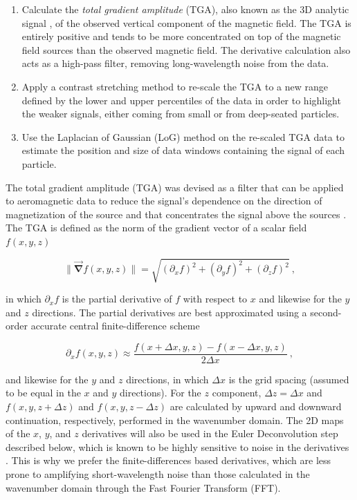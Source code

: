 \begin{enumerate}
\item Calculate the \textit{total gradient amplitude} (TGA), also known as the 3D analytic signal \citep{Roest1992Magnetic}, of the observed vertical   component of the magnetic field. The TGA is entirely positive and tends to be more concentrated on top of the magnetic field sources than the observed magnetic field. The derivative calculation also acts as a high-pass filter, removing long-wavelength noise from the data.
\item Apply a contrast stretching method to re-scale the TGA to a new range   defined by the lower and upper percentiles of the data in order to highlight the weaker signals, either coming from small or from deep-seated particles.
\item Use the Laplacian of Gaussian (LoG) method \citep{VanderWalt2014} on the   re-scaled TGA data to estimate the position and size of data windows containing the signal of each particle.
\end{enumerate}

The total gradient amplitude (TGA) was devised as a filter that can be applied
to aeromagnetic data to reduce the signal's dependence on the direction of
magnetization of the source and that concentrates the signal above the sources
\citep{Roest1992Magnetic, Nabighian2005}. The TGA is defined as the norm of the
gradient vector of a scalar field $f(x, y, z)$

\begin{equation}
\|\vec{\mathbf{\nabla}}f(x, y, z)\|  =
\sqrt{(\partial_x f)^2 + (\partial_y f)^2 + (\partial_z f)^2}
\ ,
\end{equation}

\noindent
in which $\partial_x f$ is the partial derivative of $f$ with respect to $x$
and likewise for the $y$ and $z$ directions. The partial derivatives are best
approximated using a second-order accurate central finite-difference scheme

\begin{equation}
\partial_x f(x, y, z) \approx
\dfrac{f(x + \Delta x, y, z) - f(x - \Delta x, y, z)}{2 \Delta x}
\ ,
\end{equation}

\noindent
and likewise for the $y$ and $z$ directions, in which $\Delta x$ is the grid
spacing (assumed to be equal in the $x$ and $y$ directions). For the $z$
component, $\Delta z = \Delta x$ and $f(x, y, z + \Delta z)$ and
$f(x, y, z - \Delta z)$ are calculated by upward and downward continuation,
respectively, performed in the wavenumber domain. The 2D maps of the $x$, $y$,
and $z$ derivatives will also be used in the Euler Deconvolution step described
below, which is known to be highly sensitive to noise in the derivatives
\citep{Saleh2012Applying}. This is why we prefer the finite-differences based
derivatives, which are less prone to amplifying short-wavelength noise than
those calculated in the wavenumber domain through the Fast Fourier Transform
(FFT).

